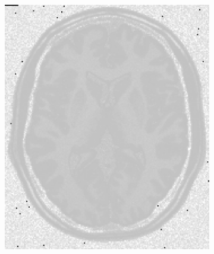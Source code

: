 \documentclass[11pt,twocolumn,twoside]{opticajnl}
\begin{document}
\begin{figure}[h]
\begin{subfigure}[h]{0.24\linewidth}
            \includegraphics[width=\textwidth]{Figuras/sustraction_exp_gamma=0.5.png}
        \end{subfigure}
                \caption{Diferencia entre la imagen original y la imagen transformada con $\gamma = 0.5$.}
                \label{fig:Exptrans0.5_sustraction}
        \begin{subfigure}[h]{0.24\linewidth}
            \centering

\end{subfigure}
\end{figure}
\end{document}
